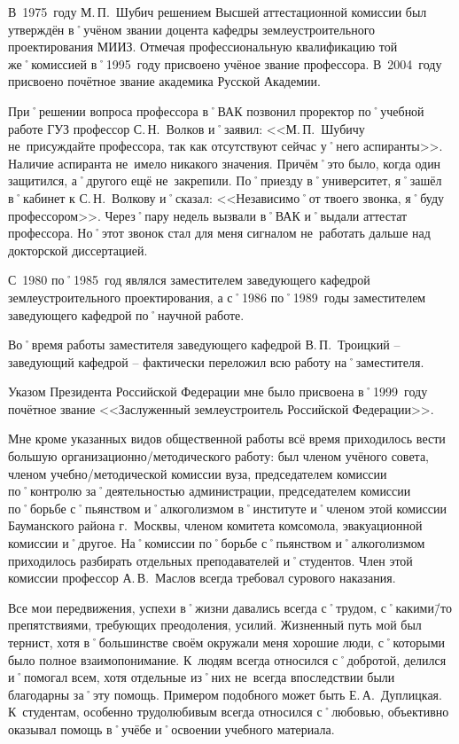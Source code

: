 В~1975~году М.\,П.~Шубич решением Высшей аттестационной комиссии был утверждён в˚учёном звании доцента кафедры землеустроительного проектирования МИИЗ. Отмечая профессиональную квалификацию той же˚комиссией в˚1995~году присвоено учёное звание профессора. В~2004~году присвоено почётное звание академика Русской Академии.

При˚решении вопроса профессора в˚ВАК позвонил проректор по˚учебной работе ГУЗ профессор С.\,Н.~Волков и˚заявил: <<М.\,П.~Шубичу не~присуждайте профессора, так как отсутствуют сейчас у˚него аспиранты>>. Наличие аспиранта не~имело никакого значения. Причём˚это было, когда один защитился, а˚другого ещё не~закрепили. По˚приезду в˚университет, я˚зашёл в˚кабинет к С.\,Н.~Волкову и˚сказал: <<Независимо˚от твоего звонка, я˚буду профессором>>. Через˚пару недель вызвали в˚ВАК и˚выдали аттестат профессора. Но˚этот звонок стал для меня сигналом не~работать дальше над докторской диссертацией.

С~1980 по˚1985~год являлся заместителем заведующего кафедрой землеустроительного проектирования, а с˚1986 по˚1989~годы заместителем заведующего кафедрой по˚научной работе.

Во˚время работы заместителя заведующего кафедрой В.\,П.~Троицкий \--- заведующий кафедрой \--- фактически переложил всю работу на˚заместителя.

Указом Президента Российской Федерации мне было присвоена в˚1999~году почётное звание <<Заслуженный землеустроитель Российской Федерации>>. 

Мне кроме указанных видов общественной работы всё время приходилось вести большую организационно\-/методического работу: был членом учёного совета, членом учебно\-/методической комиссии вуза, председателем комиссии по˚контролю за˚деятельностью администрации, председателем комиссии по˚борьбе с˚пьянством и˚алкоголизмом в˚институте и˚членом этой комиссии Бауманского района г.~Москвы, членом комитета комсомола, эвакуационной комиссии и˚другое. На˚комиссии по˚борьбе с˚пьянством и˚алкоголизмом приходилось разбирать отдельных преподавателей и˚студентов. Член этой комиссии профессор А.\,В.~Маслов всегда требовал сурового наказания.

Все мои передвижения, успехи в˚жизни давались всегда с˚трудом, с˚какими\=/то препятствиями, требующих преодоления, усилий. Жизненный путь мой был тернист, хотя в˚большинстве своём окружали меня хорошие люди, с˚которыми было полное взаимопонимание. К~людям всегда относился с˚добротой, делился и˚помогал всем, хотя отдельные из˚них не~всегда впоследствии были благодарны за˚эту помощь. Примером подобного может быть Е.\,А.~Дуплицкая. К~студентам, особенно трудолюбивым всегда относился с˚любовью, объективно оказывал помощь в˚учёбе и˚освоении учебного материала.


